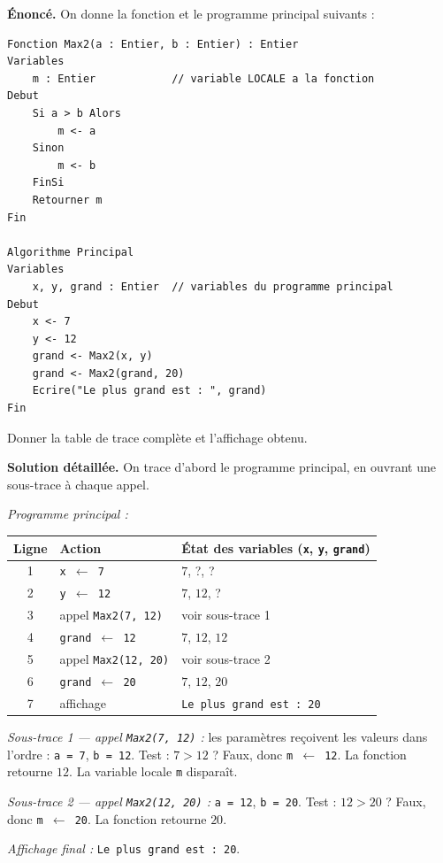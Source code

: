 \documentclass[11pt]{article}
\begin{document}
\begin{exoresolu}
\textbf{Énoncé.} On donne la fonction et le programme principal suivants :

\begin{lstlisting}
Fonction Max2(a : Entier, b : Entier) : Entier
Variables
    m : Entier            // variable LOCALE a la fonction
Debut
    Si a > b Alors
        m <- a
    Sinon
        m <- b
    FinSi
    Retourner m
Fin

Algorithme Principal
Variables
    x, y, grand : Entier  // variables du programme principal
Debut
    x <- 7
    y <- 12
    grand <- Max2(x, y)
    grand <- Max2(grand, 20)
    Ecrire("Le plus grand est : ", grand)
Fin
\end{lstlisting}

Donner la table de trace complète et l'affichage obtenu.

\tcblower
\textbf{Solution détaillée.} On trace d'abord le programme principal, en ouvrant une sous-trace à chaque appel.

\emph{Programme principal :}
\begin{center}
\begin{tabularx}{\linewidth}{|c|l|X|}
\hline
\rowcolor{popblueL} Ligne & Action & État des variables (\texttt{x}, \texttt{y}, \texttt{grand}) \\
\hline
1 & \texttt{x $\leftarrow$ 7} & $7$, ?, ? \\
\hline
2 & \texttt{y $\leftarrow$ 12} & $7$, $12$, ? \\
\hline
3 & appel \texttt{Max2(7, 12)} & voir sous-trace 1 \\
\hline
4 & \texttt{grand $\leftarrow$ 12} & $7$, $12$, $12$ \\
\hline
5 & appel \texttt{Max2(12, 20)} & voir sous-trace 2 \\
\hline
6 & \texttt{grand $\leftarrow$ 20} & $7$, $12$, $20$ \\
\hline
7 & affichage & \texttt{Le plus grand est : 20} \\
\hline
\end{tabularx}
\end{center}

\emph{Sous-trace 1 — appel \texttt{Max2(7, 12)} :} les paramètres reçoivent les valeurs dans l'ordre : \texttt{a = 7}, \texttt{b = 12}. Test : $7 > 12$ ? Faux, donc \texttt{m $\leftarrow$ 12}. La fonction retourne $12$. La variable locale \texttt{m} disparaît.

\emph{Sous-trace 2 — appel \texttt{Max2(12, 20)} :} \texttt{a = 12}, \texttt{b = 20}. Test : $12 > 20$ ? Faux, donc \texttt{m $\leftarrow$ 20}. La fonction retourne $20$.

\emph{Affichage final :} \texttt{Le plus grand est : 20}.
\end{exoresolu}
\end{document}
